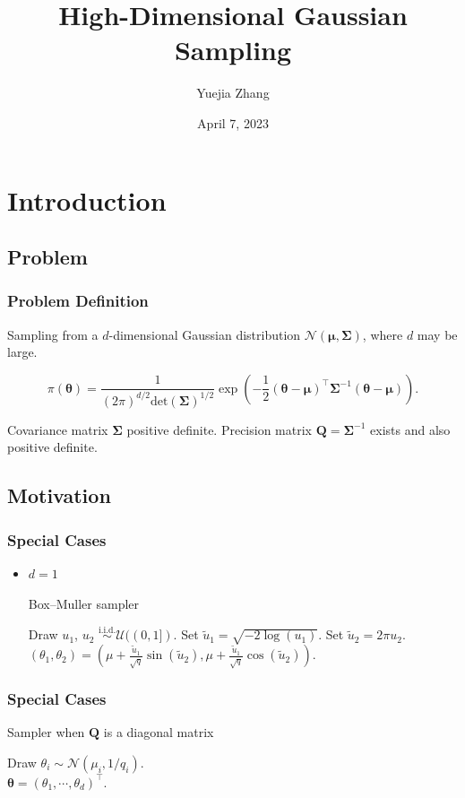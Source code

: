 \documentclass[aspectratio=169]{beamer}
\title{High-Dimensional Gaussian Sampling}
\author{Yuejia Zhang}
\date{April 7, 2023}
\newcommand{\B}[1]{\mathbf{#1}} %
\newcommand{\Bs}[1]{\boldsymbol{#1}} %
\newcommand{\pr}[1]{\left(#1\right)} %
\begin{document}
	
\begin{frame}
    \maketitle
\end{frame}

\section{Introduction} 
\subsection{Problem}
\begin{frame}
\frametitle{Problem Definition}
Sampling from a \(d\)-dimensional Gaussian distribution \(\mathcal{N}\pr{\Bs{\mu},\B{\Sigma}}\), where \(d\) may be large.

\[
    \pi(\Bs{\theta}) = \dfrac{1}{(2\pi)^{d/2}\text{det}(\B{\Sigma})^{1/2}}\exp\pr{-\dfrac{1}{2}(\Bs{\theta}-\Bs{\mu})^{\top}\B{\Sigma}^{-1}(\Bs{\theta}-\Bs{\mu})}.
\]

Covariance matrix \(\B{\Sigma}\) positive definite. Precision matrix \(\B{Q}=\B{\Sigma}^{-1}\) exists and also positive definite.
\end{frame}

\subsection{Motivation}
\begin{frame}
\frametitle{Special Cases}
\begin{itemize}
\item \(d = 1\)
\begin{algorithm}[H]
\caption{Box--Muller sampler}
\begin{algorithmic}[1]
\State Draw $u_1$, $u_2$ $\overset{\mathrm{i.i.d.}}{\sim} \mathcal{U}((0,1])$.
\State Set $\tilde{u}_1 = \sqrt{-2\log(u_1)}$.
\State Set $\tilde{u}_2 = 2\pi u_2$.\\ 
\Return $(\theta_1,\theta_2) = \pr{\mu + \frac{\tilde{u}_1}{\sqrt{q}} \sin(\tilde{u}_2),\mu + \frac{\tilde{u}_1}{\sqrt{q}} \cos(\tilde{u}_2)}$.
\end{algorithmic}
\end{algorithm}
\end{itemize}
\end{frame}

\begin{frame}
\frametitle{Special Cases}
\begin{algorithm}[H]
\caption{Sampler when $\B{Q}$ is a diagonal matrix}
\label{algo:multi_diag}
\begin{algorithmic}[1]
 \Comment{\textcolor{blue}{In some programming languages, this loop can be vectorized.}} 
\State Draw $\displaystyle{\theta_i \sim \mathcal{N}\pr{\mu_i,1/q_i}}$.
\EndFor\\
\Return $\Bs{\theta} = (\theta_1,\cdots,\theta_d)^{\top}$.
\end{algorithmic}
\end{algorithm}
\end{frame}
\end{document}
